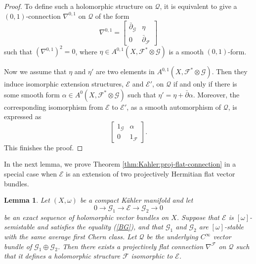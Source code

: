 \documentclass[english,reqno]{amsart}
\newcommand\sE{{\mathscr E}}
\newcommand\sF{{\mathscr F}}
\newcommand\sG{{\mathscr G}}
\newcommand\sQ{{\mathscr Q}}
\newcommand\bp{{\bar\partial}}
\theoremstyle{plain}
\newtheorem{lemma}[thm]{Lemma}
\theoremstyle{definition}
\numberwithin{equation}{section} %
\begin{document}
\begin{proof}
    To define such a holomorphic structure on $\sQ$, it is equivalent to give  a $(0,1)$-connection $\nabla^{0,1}$ on $\sQ$ of the form
    \begin{equation*}
    \nabla^{0,1}=\left[\begin{array}{cc} \bp_\sG&\eta\\
    0&\bp_\sF
    \end{array}\right]
    \end{equation*}
    such that $(\nabla^{0,1})^2=0$, where $\eta \in A^{0,1}(X,\sF^*\otimes \sG)$ is a smooth $(0,1)$-form.

    Now we assume that $\eta$ and $\eta'$ are two elements in $A^{0,1}(X,\sF^*\otimes \sG).$
    Then they induce  isomorphic extension structures, $\sE$ and $\sE'$,  on $\sQ$ if and only if there is some smooth form $\alpha \in A^0(X,\sF^*\otimes \sG)$ such that $\eta'=\eta+\bp \alpha$.
    Moreover, the corresponding isomorphism from $\sE$ to $\sE'$, as a smooth automorphism of $\sQ$,  is expressed as
    \begin{equation*}
    \left[\begin{array}{cc} 1_\sG& \alpha\\
    0&1_\sF
    \end{array}\right].
    \end{equation*}
    This finishes the proof.
\end{proof}


In the next lemma, we  prove Theorem \ref{thm:Kahler:proj-flat-connection} in a special case when $\sE$ is an extension of two projectively Hermitian flat vector bundles.

\begin{lemma}
    \label{bb} Let $(X,\omega)$ be a compact K\"ahler manifold
    and let
    $$
    0\to \sG_1\to \sE\to \sG_2\to 0
    $$
    be an exact sequence of holomorphic vector bundles on $X$.
    Suppose that $\sE$ is  $[\omega]$-semistable and satisfies the equality
    (\ref{BG}), and that $\sG_1$ and $\sG_2$ are  $[\omega]$-stable with the same average first Chern class.
    Let $\sQ$ be the underlying $C^\infty$ vector bundle of $\sG_1\oplus \sG_2$.
    Then there exists  a projectively flat
    connection $\nabla^\sF$ on $\sQ$ such that it defines a holomorphic structure $\sF$ isomorphic to $\sE$.
\end{lemma}
\end{document}
